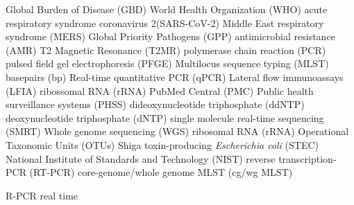 Global Burden of Disease (GBD)
World Health Organization (WHO)
acute  respiratory  syndrome  coronavirus  2(SARS-CoV-2)
Middle East respiratory syndrome (MERS)
Global Priority Pathogens (GPP)
antimicrobial resistance (AMR)
T2 Magnetic Resonance (T2MR)
polymerase chain reaction (PCR)
pulsed field gel electrophoresis (PFGE)
Multilocus sequence typing (MLST)
basepairs (bp)
Real-time quantitative PCR (qPCR)
Lateral flow immunoassays (LFIA)
ribossomal RNA (rRNA)
PubMed Central\textsuperscript{\small\textregistered} (PMC)
Public health surveillance systems (PHSS)
dideoxynucleotide triphosphate (ddNTP) 
deoxynucleotide triphosphate (dNTP)
single molecule real-time sequencing (SMRT)
Whole genome sequencing (WGS)
ribosomal RNA (rRNA)
Operational Taxonomic Units (OTUs)
Shiga toxin-producing \textit{Escherichia coli} (STEC)
National Institute of Standards and Technology (NIST)
reverse transcription-PCR (RT-PCR)
core-genome/whole genome MLST (cg/wg MLST)


R-PCR real time 